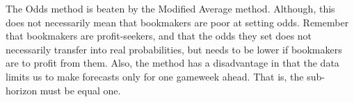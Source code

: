 \newpar

The Odds method is beaten by the Modified Average method. Although, this does not necessarily mean that bookmakers are poor at setting odds. Remember that bookmakers are profit-seekers, and that the odds they set does not necessarily transfer into real probabilities, but needs to be  lower if bookmakers are to profit from them. Also, the method has a disadvantage in that the data limits us to make forecasts only for one gameweek ahead. That is, the sub-horizon must be equal one.


